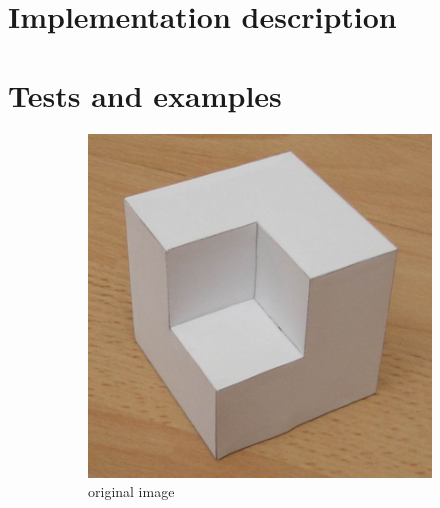 \documentclass[11pt,a4paper]{article}
\begin{document}
\section{Implementation description}

\section{Tests and examples}

\begin{figure}[H]
    \centering
    \begin{subfigure}[t]{0.48\textwidth}
        \includegraphics[width=\textwidth]{src/images/cubic_shape01.jpg}
        \caption{original image}
        \label{fig:cubic_original}
    \end{subfigure}
    \begin{subfigure}[t]{0.48\textwidth}

\end{subfigure}
\end{figure}
\end{document}
